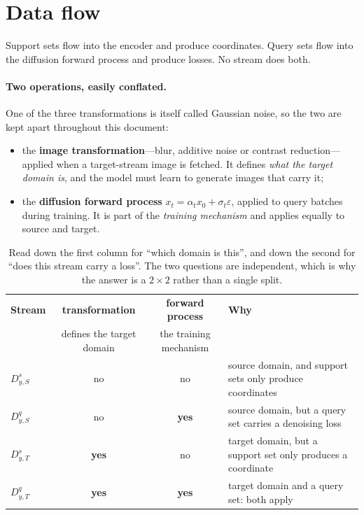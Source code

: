 \documentclass[11pt]{article}
\newcommand{\Dss}{D^{s}_{y,S}}
\newcommand{\Dqs}{D^{q}_{y,S}}
\newcommand{\Dst}{D^{s}_{y,T}}
\newcommand{\Dqt}{D^{q}_{y,T}}
\begin{document}
\section{Data flow}
\label{sec:flow-u}

Support sets flow into the encoder and produce coordinates. Query sets flow into the diffusion
forward process and produce losses. No stream does both.

\paragraph{Two operations, easily conflated.}
One of the three transformations is itself called Gaussian noise, so the two are kept apart
throughout this document:

\begin{itemize}[leftmargin=*, itemsep=2pt]
\item the \textbf{image transformation}---blur, additive noise or contrast reduction---applied
      when a target-stream image is fetched. It defines \emph{what the target domain is}, and the
      model must learn to generate images that carry it;
\item the \textbf{diffusion forward process} $x_t=\alpha_t x_0+\sigma_t\varepsilon$, applied to
      query batches during training. It is part of the \emph{training mechanism} and applies
      equally to source and target.
\end{itemize}

\begin{table}[htbp]
\centering\small
\begin{tabular}{@{}lccp{6.4cm}@{}}
\toprule
\textbf{Stream} & \textbf{transformation} & \textbf{forward process} & \textbf{Why} \\
 & \scriptsize defines the target domain & \scriptsize the training mechanism & \\
\midrule
$\Dss$ & no  & no  & source domain, and support sets only produce coordinates \\
$\Dqs$ & no  & \textbf{yes} & source domain, but a query set carries a denoising loss \\
$\Dst$ & \textbf{yes} & no  & target domain, but a support set only produces a coordinate \\
$\Dqt$ & \textbf{yes} & \textbf{yes} & target domain and a query set: both apply \\
\bottomrule
\end{tabular}
\caption{Read down the first column for ``which domain is this'', and down the second for ``does
this stream carry a loss''. The two questions are independent, which is why the answer is a
$2\times2$ rather than a single split.}
\end{table}
\end{document}
